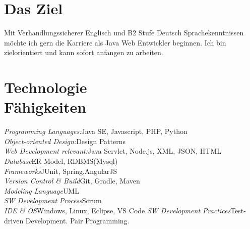 \documentclass[margin, 10pt]{res} %
\begin{document}
\begin{resume}

 
\section{Das Ziel}  


Mit Verhandlungssicherer Englisch und B2 Stufe Deutsch Sprachekenntnissen möchte ich gern die Karriere als Java\/ Web Entwickler beginnen. Ich bin zielorientiert und kann sofort anfangen zu arbeiten.

\newcommand\tab[1][1cm]{\hspace*{#1}}
\section{Technologie \\ Fähigkeiten} 

{\sl Programming Languages:}\hfill		Java SE, Javascript, PHP, Python\\
{\sl Object-oriented Design:}\hfill 		Design Patterns\\
{\sl Web Development relevant:}\hfill 	Java Servlet, Node.js, XML, JSON, HTML\\
{\sl Database}\hfill 						ER Model, RDBMS(Mysql)\\ 
{\sl Frameworks}\hfill  					JUnit, Spring,AngularJS\\
{\sl Version Control \& Build}\hfill 	Git, Gradle, Maven\\
{\sl Modeling Language}\hfill 				UML\\
{\sl SW Development Process}\hfill 		Scrum\\
{\sl IDE \& OS}\hfill  					Windows, Linux, Eclipse, VS Code
{\sl SW Development Practices}\hfill	Test-driven Development. Pair Programming.


\end{resume}
\end{document}
